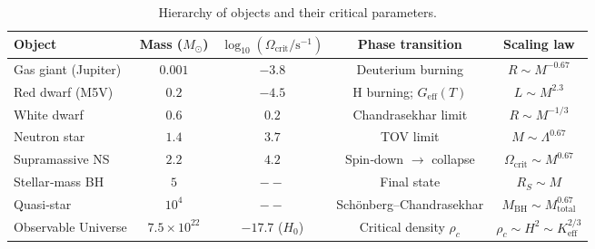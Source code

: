\documentclass[12pt,a4paper]{article}
\begin{document}
	\begin{table}[htbp]
		\centering
		\caption{Hierarchy of objects and their critical parameters.}
		\label{tab:hierarchy}
		\small
		\begin{tabular}{l c c c c}
			\toprule
			\textbf{Object} & \textbf{Mass (\(M_\odot\))} & \(\log_{10}(\Omega_{\mathrm{crit}}/\mathrm{s^{-1}})\) & \textbf{Phase transition} & \textbf{Scaling law} \\
			\midrule
			Gas giant (Jupiter) & \(0.001\) & \(-3.8\) & Deuterium burning & \(R\sim M^{-0.67}\) \\
			Red dwarf (M5V) & \(0.2\) & \(-4.5\) & H burning; \(G_{\mathrm{eff}}(T)\) & \(L\sim M^{2.3}\) \\
			White dwarf & \(0.6\) & \(0.2\) & Chandrasekhar limit & \(R\sim M^{-1/3}\) \\
			Neutron star & \(1.4\) & \(3.7\) & TOV limit & \(M\sim\Lambda^{0.67}\) \\
			Supramassive NS & \(2.2\) & \(4.2\) & Spin‑down \(\to\) collapse & \(\Omega_{\mathrm{crit}}\sim M^{0.67}\) \\
			Stellar‑mass BH & \(5\) & \(--\) & Final state & \(R_S\sim M\) \\
			Quasi‑star & \(10^4\) & \(--\) & Schönberg–Chandrasekhar & \(M_{\mathrm{BH}}\sim M_{\mathrm{total}}^{0.67}\) \\
			Observable Universe & \(7.5\times10^{22}\) & \(-17.7\) (\(H_0\)) & Critical density \(\rho_c\) & \(\rho_c\sim H^2\sim K_{\mathrm{eff}}^{2/3}\) \\
			\bottomrule
		\end{tabular}
	\end{table}
	
\end{document}
